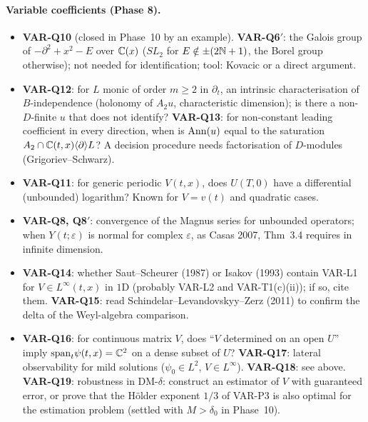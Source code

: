 \paragraph{Variable coefficients (Phase 8).}
\begin{itemize}
\item \textbf{VAR-Q10} (closed in Phase~10 by an example). \textbf{VAR-Q6$'$}: the Galois group of $-\partial^2+x^2-E$ over $\mathbb{C}(x)$ ($SL_2$ for $E\notin\pm(2\mathbb{N}+1)$, the Borel group otherwise); not needed for identification; tool: Kovacic or a direct argument.
\item \textbf{VAR-Q12}: for $L$ monic of order $m\ge2$ in $\partial_t$, an intrinsic characterisation of $B$-independence (holonomy of $A_2u$, characteristic dimension); is there a non-$D$-finite $u$ that does not identify? \textbf{VAR-Q13}: for non-constant leading coefficient in every direction, when is $\operatorname{Ann}(u)$ equal to the saturation $A_2\cap\mathbb{C}(t,x)\langle\partial\rangle L$? A decision procedure needs factorisation of $D$-modules (Grigoriev--Schwarz).
\item \textbf{VAR-Q11}: for generic periodic $V(t,x)$, does $U(T,0)$ have a differential (unbounded) logarithm? Known for $V=v(t)$ and quadratic cases.
\item \textbf{VAR-Q8, Q8$'$}: convergence of the Magnus series for unbounded operators; when $Y(t;\varepsilon)$ is normal for complex $\varepsilon$, as Casas 2007, Thm~3.4 requires in infinite dimension.
\item \textbf{VAR-Q14}: whether Saut--Scheurer (1987) or Isakov (1993) contain VAR-L1 for $V\in L^\infty(t,x)$ in $1$D (probably VAR-L2 and VAR-T1(c)(ii)); if so, cite them. \textbf{VAR-Q15}: read Schindelar--Levandovskyy--Zerz (2011) to confirm the delta of the Weyl-algebra comparison.
\item \textbf{VAR-Q16}: for continuous matrix $V$, does ``$V$ determined on an open $U$'' imply $\mathrm{span}_t\psi(t,x)=\mathbb{C}^2$ on a dense subset of $U$? \textbf{VAR-Q17}: lateral observability for mild solutions ($\psi_0\in L^2$, $V\in L^\infty$). \textbf{VAR-Q18}: see above. \textbf{VAR-Q19}: robustness in DM-$\delta$: construct an estimator of $V$ with guaranteed error, or prove that the H\"older exponent $1/3$ of VAR-P3 is also optimal for the estimation problem (settled with $M>\delta_0$ in Phase~10).
\end{itemize}

